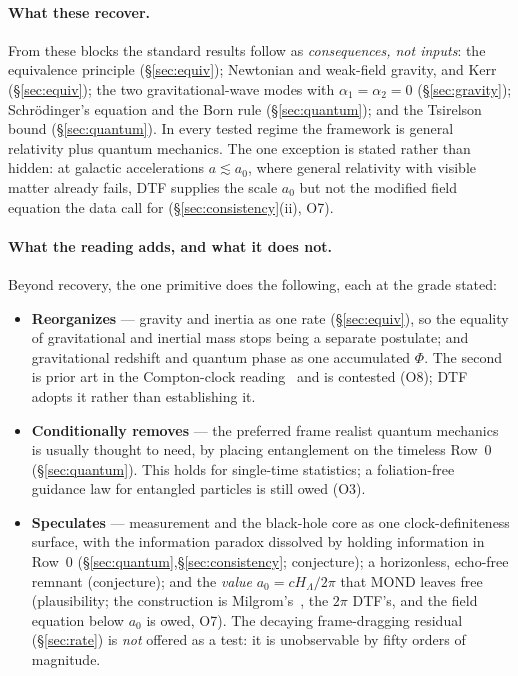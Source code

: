 \documentclass[11pt]{article}
\begin{document}
\paragraph{What these recover.} From these blocks the standard results follow as \emph{consequences, not
inputs}: the equivalence principle (\S\ref{sec:equiv}); Newtonian and weak-field gravity, and Kerr (\S\ref{sec:equiv}); the two
gravitational-wave modes with $\alpha_1=\alpha_2=0$ (\S\ref{sec:gravity}); Schr\"odinger's equation and the Born rule (\S\ref{sec:quantum});
and the Tsirelson bound (\S\ref{sec:quantum}). In every tested regime the framework is general relativity plus quantum
mechanics. The one exception is stated rather than hidden: at galactic accelerations $a\lesssim a_0$, where general
relativity with visible matter already fails, DTF supplies the scale $a_0$ but not the modified field
equation the data call for (\S\ref{sec:consistency}(ii), O7).

\paragraph{What the reading adds, and what it does not.} Beyond recovery, the one primitive does the following,
each at the grade stated:
\begin{itemize}[leftmargin=1.4em,itemsep=1.5pt,topsep=2pt]
\item \textbf{Reorganizes} --- gravity and inertia as one rate (\S\ref{sec:equiv}), so the equality of gravitational and inertial
  mass stops being a separate postulate; and gravitational redshift and quantum phase as one accumulated $\Phi$.
  The second is prior art in the Compton-clock reading~\cite{MuellerPetersChu2010,Zych2011} and is contested
  (O8); DTF adopts it rather than establishing it.
\item \textbf{Conditionally removes} --- the preferred frame realist quantum mechanics is usually thought to need,
  by placing entanglement on the timeless Row~0 (\S\ref{sec:quantum}). This holds for single-time statistics; a
  foliation-free guidance law for entangled particles is still owed (O3).
\item \textbf{Speculates} --- measurement and the black-hole core as one clock-definiteness surface, with the
  information paradox dissolved by holding information in Row~0 (\S\ref{sec:quantum},\S\ref{sec:consistency}; conjecture); a horizonless,
  echo-free remnant (conjecture); and the \emph{value} $a_0=cH_\Lambda/2\pi$ that MOND leaves free (plausibility;
  the construction is Milgrom's~\cite{Milgrom1999}, the $2\pi$ DTF's, and the field equation below $a_0$ is owed, O7). The decaying
  frame-dragging residual (\S\ref{sec:rate}) is \emph{not} offered as a test: it is unobservable by fifty orders of magnitude.
\end{itemize}
\end{document}
